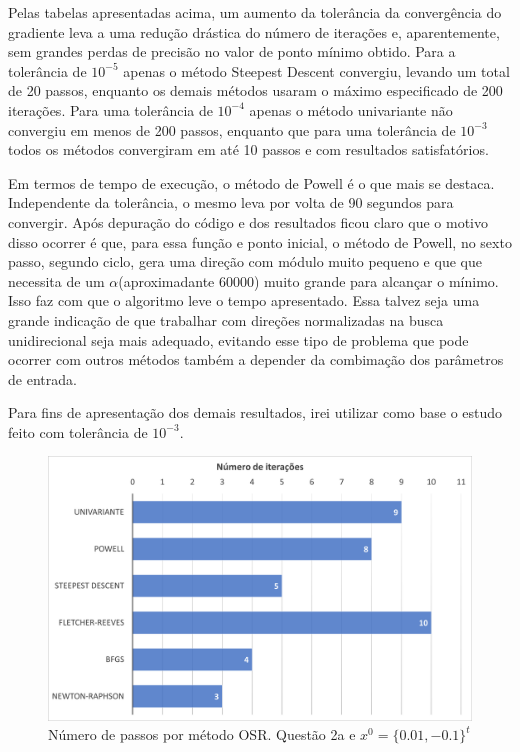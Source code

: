 \documentclass[10pt, a4paper]{article}
\begin{document}
Pelas tabelas apresentadas acima, um aumento da tolerância da convergência do gradiente leva a uma redução drástica
do número de iterações e, aparentemente, sem grandes perdas de precisão no valor de ponto mínimo obtido. Para a 
tolerância de $10^{-5}$ apenas o método Steepest Descent convergiu, levando um total de 20 passos, enquanto os 
demais métodos usaram o máximo especificado de 200 iterações. Para uma tolerância de $10^{-4}$ apenas o método univariante
não convergiu em menos de 200 passos, enquanto que para uma tolerância de $10^{-3}$ todos os métodos convergiram em até 10
passos e com resultados satisfatórios.

Em termos de tempo de execução, o método de Powell é o que mais se destaca. Independente da tolerância, o mesmo leva por volta
de 90 segundos para convergir. Após depuração do código e dos resultados ficou claro que o motivo disso ocorrer é que, 
para essa função e ponto inicial, o método de Powell, no sexto passo, segundo ciclo, gera uma direção com módulo muito pequeno e que
que necessita de um $\alpha$(aproximadante 60000) muito grande para alcançar o mínimo. Isso faz com que o algoritmo leve o tempo apresentado.
Essa talvez seja uma grande indicação de que trabalhar com direções normalizadas na busca unidirecional
seja mais adequado, evitando esse tipo de problema que pode ocorrer com outros métodos também a depender da combimação 
dos parâmetros de entrada.

Para fins de apresentação dos demais resultados, irei utilizar como base o estudo feito com tolerância de $10^{-3}$.

\begin{figure}[H]
  \centering
  \includegraphics[scale=0.4]{figuras/q2a_passos_P1.PNG}
  \caption{Número de passos por método OSR. Questão 2a e $x^0 = \{0.01,-0.1\}^t$}
\end{figure}
\end{document}
